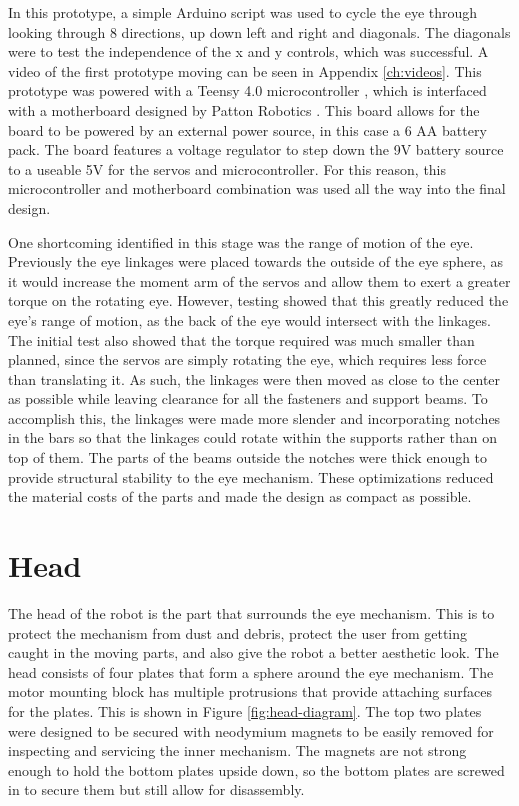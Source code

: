 In this prototype, a simple Arduino script was used to cycle the eye through looking through 8 directions, up down left and right and diagonals. The diagonals were to test the independence of the x and y controls, which was successful. A video of the first prototype moving can be seen in Appendix \ref{ch:videos}. This prototype was powered with a Teensy 4.0 microcontroller \cite{pjrcTeensy2023}, which is interfaced with a motherboard designed by Patton Robotics \cite{pattonPRT28Patton2018}. This board allows for the board to be powered by an external power source, in this case a 6 AA battery pack. The board features a voltage regulator to step down the 9V battery source to a useable 5V for the servos and microcontroller. For this reason, this microcontroller and motherboard combination was used all the way into the final design. 

One shortcoming identified in this stage was the range of motion of the eye. Previously the eye linkages were placed towards the outside of the eye sphere, as it would increase the moment arm of the servos and allow them to exert a greater torque on the rotating eye. However, testing showed that this greatly reduced the eye's range of motion, as the back of the eye would intersect with the linkages. The initial test also showed that the torque required was much smaller than planned, since the servos are simply rotating the eye, which requires less force than translating it. As such, the linkages were then moved as close to the center as possible while leaving clearance for all the fasteners and support beams. To accomplish this, the linkages were made more slender and incorporating notches in the bars so that the linkages could rotate within the supports rather than on top of them. The parts of the beams outside the notches were thick enough to provide structural stability to the eye mechanism. These optimizations reduced the material costs of the parts and made the design as compact as possible.

\section{Head}
The head of the robot is the part that surrounds the eye mechanism. This is to protect the mechanism from dust and debris, protect the user from getting caught in the moving parts, and also give the robot a better aesthetic look. The head consists of four plates that form a sphere around the eye mechanism. The motor mounting block has multiple protrusions that provide attaching surfaces for the plates. This is shown in Figure \ref{fig:head-diagram}. The top two plates were designed to be secured with neodymium magnets to be easily removed for inspecting and servicing the inner mechanism. The magnets are not strong enough to hold the bottom plates upside down, so the bottom plates are screwed in to secure them but still allow for disassembly. 

